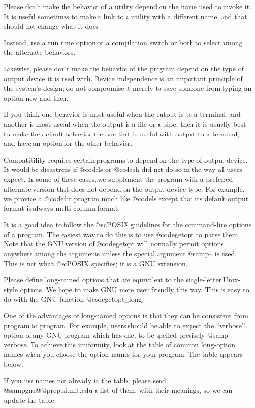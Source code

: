 Please don't make the behavior of a utility depend on the name used
to invoke it.  It is useful sometimes to make a link to a utility
with a different name, and that should not change what it does.

Instead, use a run time option or a compilation switch or both
to select among the alternate behaviors.

Likewise, please don't make the behavior of the program depend on the
type of output device it is used with.  Device independence is an
important principle of the system's design; do not compromise it
merely to save someone from typing an option now and then.

If you think one behavior is most useful when the output is to a
terminal, and another is most useful when the output is a file or a
pipe, then it is usually best to make the default behavior the one that
is useful with output to a terminal, and have an option for the other
behavior.

Compatibility requires certain programs to depend on the type of output
device.  It would be disastrous if @code{ls} or @code{sh} did not do so
in the way all users expect.  In some of these cases, we supplement the
program with a preferred alternate version that does not depend on the
output device type.  For example, we provide a @code{dir} program much
like @code{ls} except that its default output format is always
multi-column format.

It is a good idea to follow the @sc{POSIX} guidelines for the
command-line options of a program.  The easiest way to do this is to use
@code{getopt} to parse them.  Note that the GNU version of @code{getopt}
will normally permit options anywhere among the arguments unless the
special argument @samp{--} is used.  This is not what @sc{POSIX}
specifies; it is a GNU extension.

Please define long-named options that are equivalent to the
single-letter Unix-style options.  We hope to make GNU more user
friendly this way.  This is easy to do with the GNU function
@code{getopt_long}.

One of the advantages of long-named options is that they can be
consistent from program to program.  For example, users should be able
to expect the ``verbose'' option of any GNU program which has one, to be
spelled precisely @samp{--verbose}.  To achieve this uniformity, look at
the table of common long-option names when you choose the option names
for your program.  The table appears below.

If you use names not already in the table, please send
@samp{gnu@@prep.ai.mit.edu} a list of them, with their meanings, so we
can update the table.


